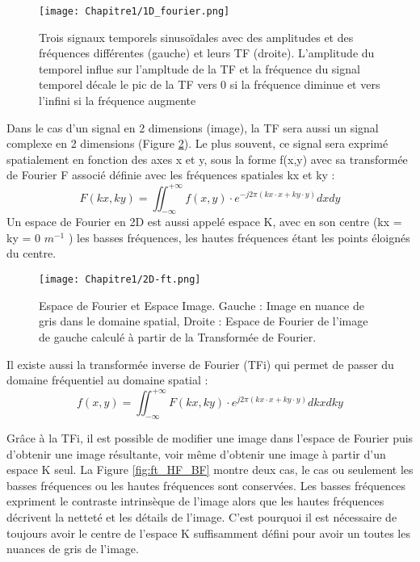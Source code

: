 \begin{figure}[!htbp]
  \begin{center}
    \texttt{[image: Chapitre1/1D\_fourier.png]}
     \end{center}
    \caption{Trois signaux temporels sinusoïdales avec des amplitudes et des fréquences différentes (gauche) et leurs TF (droite). L'amplitude du temporel influe sur l'ampltude de la  TF et la fréquence du signal temporel décale le pic de la TF vers 0 si la fréquence diminue et vers l'infini si la fréquence augmente}
  \label{fig:ft_1D}
\end{figure}
\clearpage
Dans le cas d’un signal en 2 dimensions  (image),  la TF sera aussi un signal complexe en 2 dimensions (Figure \ref{fig:ft_2D}). Le plus souvent, ce signal sera exprimé spatialement en fonction des axes x et y, sous la forme f(x,y) avec sa transformée de Fourier F associé définie avec les fréquences spatiales kx et ky :
\begin{equation}
\nonumber
F(kx,ky)=\iint_{-\infty}^{+\infty}{f(x,y)\cdot e^{-j2\pi(kx\cdot x+ky\cdot y)}dxdy}
\end{equation}
Un espace de Fourier en 2D est aussi appelé espace K, avec en son centre (kx = ky = 0 $m^{-1}$ ) les basses fréquences, les hautes fréquences étant les points éloignés du centre.

\begin{figure}[!htbp]
  \begin{center}
    \texttt{[image: Chapitre1/2D-ft.png]}
     \end{center}
    \caption{Espace de Fourier et Espace Image. Gauche : Image en nuance de gris dans le domaine spatial, Droite : Espace de Fourier de l’image de gauche calculé à partir de la Transformée de Fourier.}
  \label{fig:ft_2D}
\end{figure}



Il existe aussi la transformée inverse de Fourier (TFi) qui permet de passer du domaine fréquentiel au domaine spatial :
\begin{equation}
\nonumber
f(x,y)=\iint_{-\infty}^{+\infty}{F\left(kx,ky\right)\cdot e^{j2\pi(kx\cdot x+ky\cdot y)}dkxdky}
\end{equation}

Grâce à la TFi, il est possible de modifier une image dans l’espace de Fourier puis d’obtenir une image résultante, voir même d’obtenir une image à partir d’un espace K seul. La Figure \ref{fig:ft_HF_BF} montre deux cas, le cas ou seulement les basses fréquences ou les hautes fréquences sont conservées. Les basses fréquences expriment le contraste intrinsèque de l’image alors que les hautes fréquences décrivent la netteté et les détails de l’image. C’est pourquoi il est nécessaire de toujours avoir le centre de l’espace K suffisamment défini pour avoir un toutes les nuances de gris de l’image.


